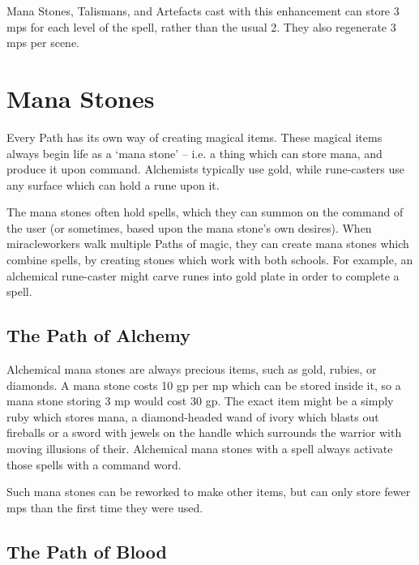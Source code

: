 \begin{multicols}{2}
\spelllevel


Mana Stones, Talismans, and Artefacts cast with this enhancement can store 3 \glspl{mp} for each level of the spell, rather than the usual 2.
They also regenerate 3 \glspl{mp} per scene.

\stopcontents[magic]

\section{Mana Stones}

\begin{multicols}{2}

\noindent
Every Path has its own way of creating magical items.
These magical items always begin life as a `mana stone' -- i.e. a thing which can store mana, and produce it upon command.
Alchemists typically use gold, while rune-casters use any surface which can hold a rune upon it.

The mana stones often hold spells, which they can summon on the command of the user (or sometimes, based upon the mana stone's own desires).
When \glspl{miracleworker} walk multiple Paths of magic, they can create mana stones which combine spells, by creating stones which work with both schools.
For example, an alchemical rune-caster might carve runes into gold plate in order to complete a spell.

\subsection{The Path of Alchemy}


Alchemical mana stones are always precious items, such as gold, rubies, or diamonds.
A mana stone costs 10 gp per \gls{mp} which can be stored inside it, so a mana stone storing 3 \gls{mp} would cost 30 gp.
The exact item might be a simply ruby which stores mana, a diamond-headed wand of ivory which blasts out fireballs or a sword with jewels on the handle which surrounds the warrior with moving illusions of their.
Alchemical mana stones with a spell always activate those spells with a command word.

Such mana stones can be reworked to make other items, but can only store fewer \glspl{mp} than the first time they were used.

\subsection{The Path of Blood}


\end{multicols}
\end{multicols}
